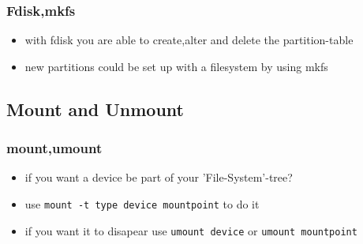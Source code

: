 \documentclass[handout]{beamer}
\newcommand{\code}[1]{\colorbox{lGray}{\texttt{#1}}}
\begin{document}
    	\begin{frame}
			\frametitle{Fdisk,mkfs}
			\begin{itemize}
                \item<1-> with fdisk you are able to create,alter and delete the partition-table
                \item<1-> new partitions could be set up with a filesystem by using mkfs
            \end{itemize}
		\end{frame}
    \subsection{Mount and Unmount}
	    \begin{frame}
			\frametitle{mount,umount}
			\begin{itemize}
                \item<1-> if you want a device be part of your 'File-System'-tree?
                \item<1-> use \code{mount -t type device mountpoint} to do it
                \item<2-> if you want it to disapear use \code{umount device} or \code{umount mountpoint}
            \end{itemize}
		\end{frame}
\end{document}
